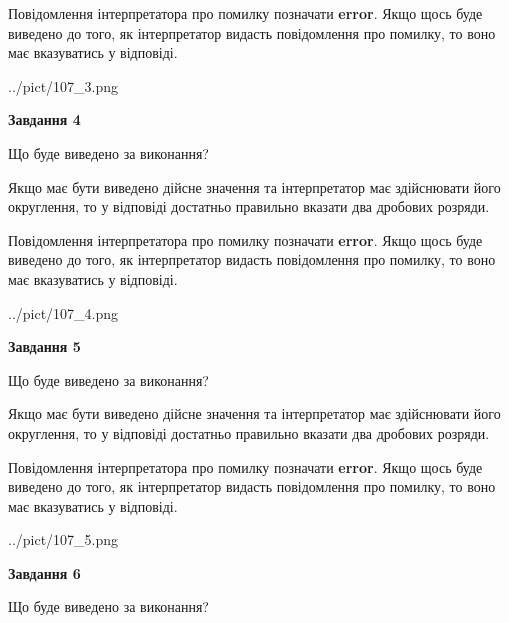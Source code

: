 \documentclass[12pt, ukrainian]{article}
\begin{document}
{\begin {Large}
Повідомлення інтерпретатора про помилку позначати \textbf{error}.
Якщо щось буде виведено до того, як інтерпретатор видасть повідомлення про помилку, 
то воно має вказуватись у відповіді. \par

\begin{center}
	{../pict/107_3.png}
\end{center}
\newpage

{\begin {center}\textbf{Завдання 4}\end {center}}\par
Що буде виведено за виконання? \par

Якщо має бути виведено дійсне значення та інтерпретатор має здійснювати його округлення, 
то у відповіді достатньо правильно вказати два дробових розряди.

Повідомлення інтерпретатора про помилку позначати \textbf{error}.
Якщо щось буде виведено до того, як інтерпретатор видасть повідомлення про помилку, 
то воно має вказуватись у відповіді. \par

\begin{center}
	{../pict/107_4.png}
\end{center}
\newpage

{\begin {center}\textbf{Завдання 5}\end {center}}\par
Що буде виведено за виконання? \par

Якщо має бути виведено дійсне значення та інтерпретатор має здійснювати його округлення, 
то у відповіді достатньо правильно вказати два дробових розряди.

Повідомлення інтерпретатора про помилку позначати \textbf{error}.
Якщо щось буде виведено до того, як інтерпретатор видасть повідомлення про помилку, 
то воно має вказуватись у відповіді. \par

\begin{center}
	{../pict/107_5.png}
\end{center}
\newpage

{\begin {center}\textbf{Завдання 6}\end {center}}\par
Що буде виведено за виконання? \par


\end{Large}}
\end{document}
